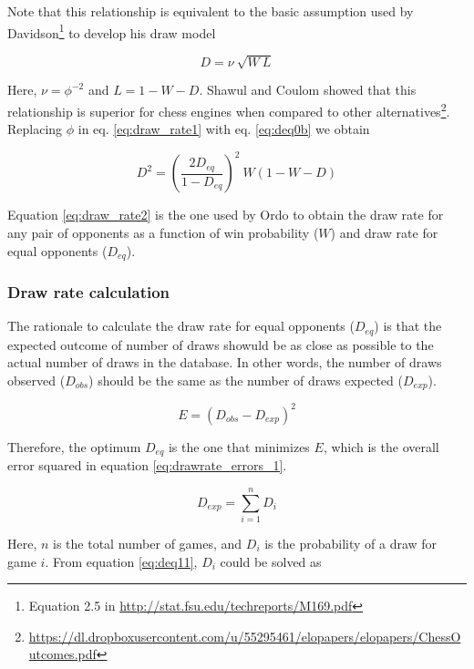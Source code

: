 \documentclass[12pt]{article}
\begin{document}
Note that this relationship is equivalent to the basic assumption used by Davidson\footnote{Equation 2.5 in \url{http://stat.fsu.edu/techreports/M169.pdf}} to develop his draw model

	\begin{equation} \label{eq:drawrate_davidson}
	D = \nu\: \sqrt{W \: L}  
	\end{equation}

Here, $\nu = \phi^{-2}$ and $L = 1 - W - D$. Shawul and Coulom showed that this relationship is superior for chess engines when compared to other alternatives\footnote{\url{https://dl.dropboxusercontent.com/u/55295461/elopapers/elopapers/ChessOutcomes.pdf}}.
Replacing $\phi$ in eq. \ref{eq:draw_rate1} with eq. \ref{eq:deq0b} we obtain

	\begin{equation} \label{eq:draw_rate2}
	D^2 = \left(\frac{2 D_{eq}}{1-D_{eq}}\right)^2\: W (1 - W - D)  
	\end{equation}

Equation \ref{eq:draw_rate2} is the one used by Ordo to obtain the draw rate for any pair of opponents as a function of win probability ($W$) and draw rate for equal opponents ($D_{eq}$).


\subsubsection*{Draw rate calculation}

The rationale to calculate the draw rate for equal opponents ($D_{eq}$) is that the expected outcome of number of draws showuld be as close as possible to the actual number of draws in the database.
In other words, the number of draws observed ($D_{obs}$) should be the same as the number of draws expected ($D_{exp}$).

	\begin{equation} \label{eq:drawrate_errors_1}
	E = (D_{obs} - D_{exp})^2
	\end{equation}

Therefore, the optimum $D_{eq}$ is the one that minimizes $E$, which is the overall error squared in equation \ref{eq:drawrate_errors_1}.

	\begin{equation} \label{eq:drawrate_errors_1b}
	D_{exp} = \sum\limits_{i=1}^n D_{i} 
	\end{equation}

Here, $n$ is the total number of games, and $D_{i}$ is the probability of a draw for game $i$.
From equation \ref{eq:deq11}, $D_{i}$ could be solved as
\end{document}
